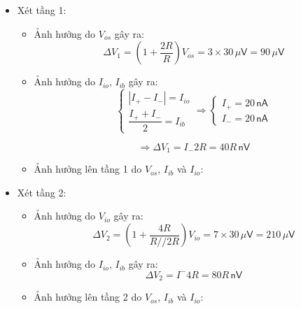 
\begin{itemize}[label=-]
	\item Xét tầng 1:
	\begin{itemize}[label=+]
		\item Ảnh hưởng do $V_{os}$ gây ra:
		\[
		{ {\Delta V}}_1=\left(1+\frac{2R}{R}\right)V_{os}=3\times30\,\mu\textsf{V}=90\,\mu\textsf{V}
		\]
		
		\item Ảnh hưởng do $I_{io}$, $I_{ib}$ gây ra:
		\[
		\left\{
		\begin{matrix}
			| I_{+} - I_{-} | = I_{io} 	\\[4pt]
			\dfrac{I_{+} + I_{-}}{2} = I_{ib}
		\end{matrix}
		\right.
		\Rightarrow
		\left\{
		\begin{matrix}
			I_{+} = 20\,\textsf{nA}	\\[4pt]
			I_{-} = 20\,\textsf{nA}
		\end{matrix}
		\right.
		\]
		
		\[ \Rightarrow \Delta V_1 = I_{-} 2R = 40R \,\textsf{nV} \]
		\item Ảnh hưởng lên tầng 1 do $V_{os}$, $I_{ib}$ và $I_{io}$:
		
	
	\end{itemize}
	
	\item Xét tầng 2:
	\begin{itemize}[label=+]
		\item Ảnh hưởng do $V_{io}$ gây ra:
		\[
		 \Delta V_2 = \left( 1 + \frac{4R}{R // 2R} \right) V_{io} = 7 \times 30 \,\mu\textsf{V} = 210\,\mu\textsf{V}
		\]
		
		\item Ảnh hưởng do $I_{io}$, $I_{ib}$ gây ra:
		\[
		\Delta V_2 = I^{-} 4R = 80R\,\textsf{nV}
		\]
		
		\item Ảnh hưởng lên tầng 2 do $V_{os}$, $I_{ib}$ và $I_{io}$:
		
	\end{itemize}
	

\end{itemize}
